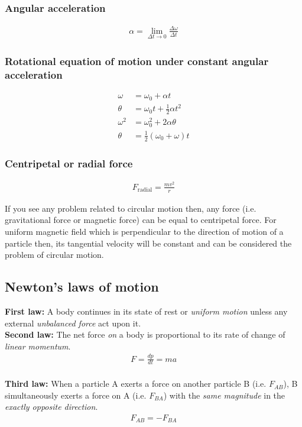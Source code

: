 \documentclass[12pt,a4paper]{article}
\begin{document}
\subsubsection*{Angular acceleration}
\begin{align*}
\alpha = \lim_{\Delta t \to 0}\frac{\Delta \omega}{\Delta t}
\end{align*}

\subsubsection*{Rotational equation of motion under constant angular acceleration}
\begin{align}
\omega &= \omega_{0} + \alpha t \\
\theta &= \omega_{0}t + \frac{1}{2}\alpha t^{2} \\
\omega^{2} &= \omega_{0}^{2} + 2\alpha \theta \\
\theta &= \frac{1}{2}(\omega_{0} + \omega)t
\end{align}

\subsubsection*{Centripetal or radial force}
\begin{align}
F_{\text{radial}} = \frac{mv^{2}}{r}
\end{align}

If you see any problem related to circular motion then, any force (i.e. gravitational force or magnetic force) can be equal to centripetal force. For uniform magnetic field which is perpendicular to the direction of motion of a particle then, its tangential velocity will be constant and can be considered the problem of circular motion.


\subsection{Newton's laws of motion}

\noindent\textbf{First law:} A body continues in its state of rest or \emph{uniform motion} unless any external \emph{unbalanced force} act upon it.
\\
\textbf{Second law:} The net force \emph{on} a body is proportional to its rate of change of \emph{linear momentum}.
\begin{align*}
F = \frac{dp}{dt} = ma
\end{align*}
\\
\textbf{Third law:} When a particle A exerts a force on another particle B (i.e. $F_{AB}$), B simultaneously exerts a force on A (i.e. $F_{BA}$) with the \emph{same magnitude} in the \emph{exactly opposite direction}.
\begin{align*}
F_{AB} = - F_{BA}
\end{align*}
\end{document}
